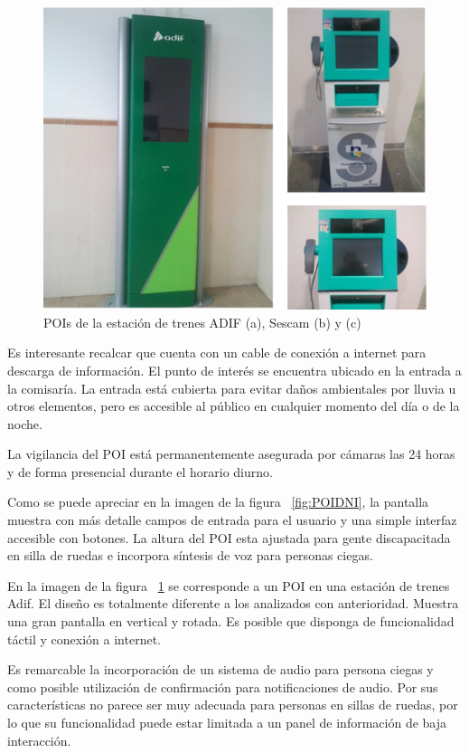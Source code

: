 \begin{figure}[ht]
    \begin{center}
        \includegraphics[width=425px]{src/img/adif-sescam-combined.jpg}
        \caption[POIs de la estación de trenes ADIF (a), Sescam (b) y
        (c)] {POIs de la estación de trenes ADIF (a), Sescam (b) y
        (c)}
        \label{fig:POI_ADIF}
    \end{center}
\end{figure}

Es interesante recalcar que cuenta con un cable de conexión a internet para descarga de
información. El punto de interés se encuentra ubicado en la entrada a la
comisaría. La entrada está cubierta para evitar daños ambientales por lluvia u otros
elementos, pero es accesible al público en cualquier momento del día o
de la noche.

\newpage 
La vigilancia del POI está permanentemente asegurada por cámaras las 24 
horas y de forma presencial durante el horario diurno.

Como se puede apreciar en la imagen de la figura ~\ref{fig:POIDNI}, la pantalla
muestra con más detalle campos de entrada para el usuario y una simple 
interfaz accesible con botones.
La altura del POI esta ajustada para gente discapacitada en silla de ruedas e
incorpora síntesis de voz para personas ciegas.

En la imagen de la figura ~\ref{fig:POI_ADIF} se corresponde a un POI en una
estación de trenes Adif. El diseño es totalmente diferente a los analizados 
con anterioridad.
Muestra una gran pantalla en vertical y rotada. Es posible que disponga de
funcionalidad táctil y conexión a internet.

Es remarcable la incorporación de un sistema de audio para persona ciegas y
como posible utilización de confirmación para notificaciones de audio. Por sus
características no parece ser muy adecuada para personas en sillas de ruedas,
por lo que su funcionalidad puede estar limitada a un panel de información de
baja interacción.

